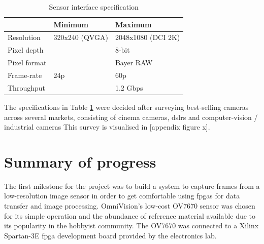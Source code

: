 \documentclass[a4paper]{report}
\begin{document}
\begin{table}
  \centering
  \begin{tabular}{l | ll}
               & Minimum        & Maximum            \\
  \hline
  Resolution   & 320x240 (QVGA) & 2048x1080 (DCI 2K) \\
  Pixel depth  &                & 8-bit              \\
  Pixel format &                & Bayer RAW          \\
  Frame-rate   & 24p            & 60p                \\
  Throughput   &                & 1.2 Gbps          
  \end{tabular}
  \caption{Sensor interface specification}
  \label{table:interface_specification}
\end{table}

The specifications in Table \ref{table:interface_specification} were decided after surveying best-selling cameras across several markets, consisting of cinema cameras, \glspl{dslr} and computer-vision / industrial cameras This survey is visualised in [appendix figure x].




\printglossary[type=\acronymtype]

\chapter{Summary of progress}

The first milestone for the project was to build a system to capture frames from a low-resolution image sensor in order to get comfortable using \glspl{fpga} for data transfer and image processing. OmniVision's low-cost OV7670 sensor was chosen for its simple operation and the abundance of reference material available due to its popularity in the hobbyist community. The OV7670 was connected to a Xilinx Spartan-3E \gls{fpga} development board provided by the electronics lab.
\end{document}
